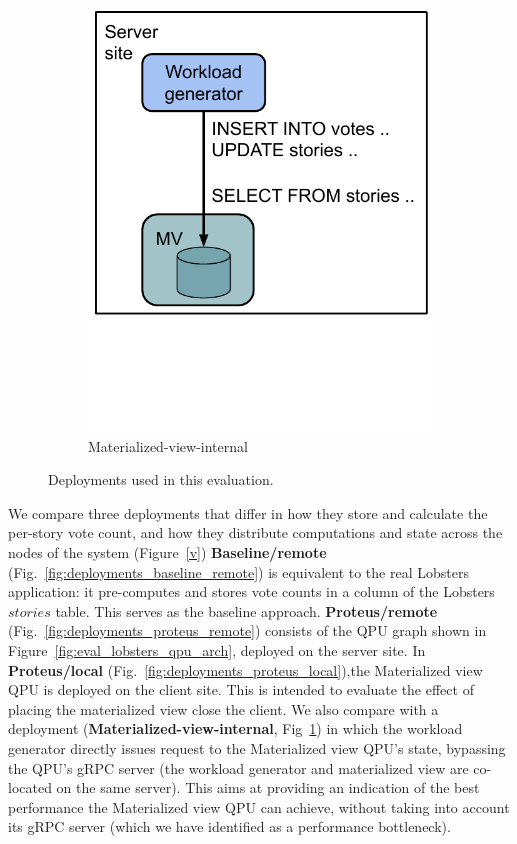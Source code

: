 \begin{figure}[H]
\begin{subfigure}[b]{0.24\textwidth}
            \includegraphics[width=\textwidth]{./figures/evaluation/evaluation_deployments_internal.pdf}
            \caption{Materialized-view-internal}
            \label{fig:deployments_mv_internal}
        \end{subfigure}
        \caption{Deployments used in this evaluation.}
        \label{fig:eval_deployments}
    \end{figure}

We compare three deployments that differ in how they store and calculate the per-story vote count,
and how they distribute computations and state across the nodes of the system (Figure~\ref{v})
\textbf{Baseline/remote} (Fig.~\ref{fig:deployments_baseline_remote}) is equivalent to the real Lobsters application:
it pre-computes and stores vote counts in a column of the Lobsters $stories$ table.
This serves as the baseline approach.
\textbf{Proteus/remote} (Fig.~\ref{fig:deployments_proteus_remote}) consists of the QPU graph shown in Figure~\ref{fig:eval_lobsters_qpu_arch},
deployed on the server site.
In \textbf{Proteus/local} (Fig.~\ref{fig:deployments_proteus_local}),the Materialized view QPU is deployed on the client site.
This is intended to evaluate the effect of placing the materialized view close the client.
We also compare with a deployment (\textbf{Materialized-view-internal}, Fig~\ref{fig:deployments_mv_internal}) in which the workload generator
directly issues request to the Materialized view QPU's state, bypassing the QPU's gRPC server
(the workload generator and materialized view are co-located on the same server).
This aims at providing an indication of the best performance the Materialized view QPU can achieve,
without taking into account its gRPC server (which we have identified as a performance bottleneck).

